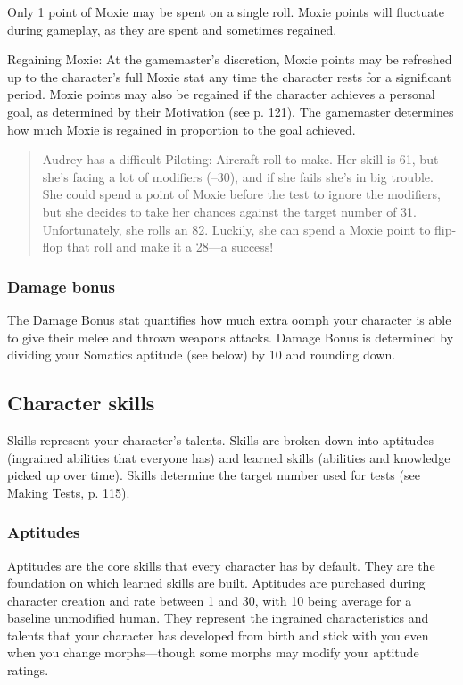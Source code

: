 Only 1 point of Moxie may be spent on a single roll.  Moxie points
will fluctuate during gameplay, as they are spent and sometimes
regained.

Regaining Moxie: At the gamemaster's discretion, Moxie points may be
refreshed up to the character's full Moxie stat any time the character
rests for a significant period. Moxie points may also be regained if
the character achieves a personal goal, as determined by their
Motivation (see p. 121). The gamemaster determines how much Moxie is
regained in proportion to the goal achieved.

\begin{quotation}
  Audrey has a difficult Piloting: Aircraft roll to make.  Her skill
  is 61, but she's facing a lot of modifiers (–30), and if she fails
  she's in big trouble. She could spend a point of Moxie before the
  test to ignore the modifiers, but she decides to take her chances
  against the target number of 31. Unfortunately, she rolls an
  82. Luckily, she can spend a Moxie point to flip-flop that roll and
  make it a 28—a success!
\end{quotation}

\subsubsection{Damage bonus}
\label{sec:damage-bonus}

The Damage Bonus stat quantifies how much extra oomph your character
is able to give their melee and thrown weapons attacks. Damage Bonus
is determined by dividing your Somatics aptitude (see below) by 10 and
rounding down.

\subsection{Character skills}
\label{sec:character-skills}

Skills represent your character's talents. Skills are broken down into
aptitudes (ingrained abilities that everyone has) and learned skills
(abilities and knowledge picked up over time). Skills determine the
target number used for tests (see Making Tests, p. 115).

\subsubsection{Aptitudes}
\label{sec:aptitudes}

Aptitudes are the core skills that every character has by
default. They are the foundation on which learned skills are
built. Aptitudes are purchased during character creation and rate
between 1 and 30, with 10 being average for a baseline unmodified
human. They represent the ingrained characteristics and talents that
your character has developed from birth and stick with you even when
you change morphs—though some morphs may modify your aptitude ratings.

